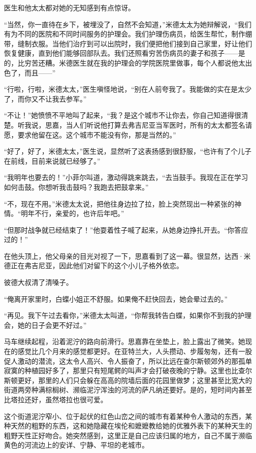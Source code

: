 \par 医生和他太太都对她的无知感到有点惊讶。
\par “当然，你一直待在乡下，被埋没了，自然不会知道，”米德太太为她辩解说，“我们有为不同的医院和不同时间服务的护理会。我们护理伤病员，给医生帮忙，制作绷带，缝制衣服。当他们治疗到可以出院时，我们便把他们接到自己家里，好让他们恢复健康，直到他们能够回部队去。我们还照看穷苦伤病员的妻子和孩子——是的，比穷苦还糟。米德医生就在我的护理会的学院医院里做事，每个人都说他太出色了，而且——”
\par “行啦，行啦，米德太太，”医生嗔怪地说，“别在人前夸我了。我能做的实在是太少了，而你又不让我去参军。”
\par “不让！”她愤愤不平地叫了起来，“我？是这个城市不让你去，你自己知道得很清楚。听我说，思嘉，当人们听说他打算去弗吉尼亚当军医时，所有的太太都签名请愿，要求他留在这。这个城市不能没有你，那是当然的。”
\par “好了，好了，米德太太，”医生说，显然听了这表扬感到很舒服，“也许有了个儿子在前线，目前来说就已经够了。”
\par “我明年也要去的！”小菲尔叫道，激动得跳来跳去，“去当鼓手。我现在正在学习如何击鼓。你想听我击鼓吗？我跑去把鼓拿来。”
\par “不，现在不用。”米德太太说，把他往身边拉了拉，脸上突然现出一种紧张的神情。“明年不行，亲爱的，也许后年吧。”
\par “但那时战争就已经结束了！”他耍着性子喊了起来，从她身边挣扎开去。“你答应过的！”
\par 在他头顶上，他父母亲的目光对视了一下，思嘉看到了这一幕。很显然，达西·米德正在弗吉尼亚，因此他们对留下的这个小儿子格外依恋。
\par 彼德大叔清了清嗓子。
\par “俺离开家里时，白蝶小姐正不舒服。如果俺不赶快回去，她会晕过去的。”
\par “再见。我下午过去看你，”米德太太叫道，“你帮我转告白蝶，如果你不到我的护理会，她的日子会更不好过。”
\par 马车继续起程，沿着泥泞的路向前滑行。思嘉靠在坐垫上，脸上露出了微笑。她现在的感觉比几个月来的感觉都更好。在亚特兰大，人头攒动、步履匆匆，还有一股促人激动的潜流，这太令人高兴、令人振奋了，所以比远在查尔斯顿郊外的那孤单寂寞的种植园好多了，那里只有短尾鳄的叫声才会打破夜晚的宁静。这里也比查尔斯顿更好，那里的人们只会躲在高高的院墙后面的花园里做梦；这里甚至比宽大的街道两旁种满棕榈树、濒临泥泞浑浊的河流的萨凡纳还要好。是的，短时间内甚至比塔拉还好，虽然塔拉也很可爱。
\par 这个街道泥泞窄小、位于起伏的红色山峦之间的城市有着某种令人激动的东西，某种天然的粗野的东西，这和她隐藏在埃伦和嬷嬷教给她的优雅外表下的某种天生的粗野天性正好吻合。她突然感到，这里正是自己应该归属的地方，自己不属于濒临黄色的河流边上的安详、宁静、平坦的老城市。
